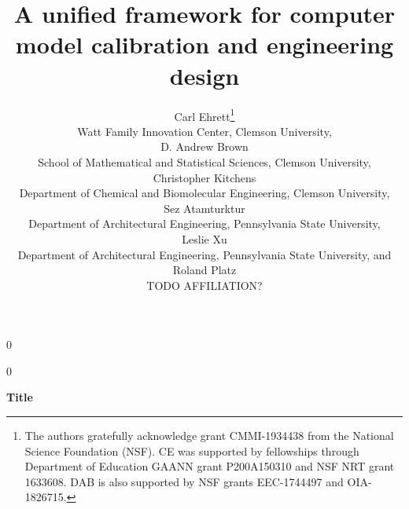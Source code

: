 \documentclass[12pt]{article}
\date{}
\newcommand{\blind}{0}
\begin{document}
%

\def\spacingset#1{\renewcommand{\baselinestretch}%
{#1}\small\normalsize} \spacingset{1}



\blind
{
  \title{\bf A unified framework for computer model calibration and engineering design}
  \author{Carl Ehrett\thanks{
  		The authors gratefully acknowledge grant CMMI-1934438 from the National Science Foundation (NSF). CE was supported by fellowships through Department of Education GAANN grant P200A150310 and NSF NRT grant 1633608. DAB is also supported by NSF grants EEC-1744497 and OIA-1826715.}\hspace{.2cm}\\
    Watt Family Innovation Center, Clemson University,\\
    D. Andrew Brown \\
    School of Mathematical and Statistical Sciences, Clemson University,\\
    Christopher Kitchens \\
    Department of Chemical and Biomolecular Engineering, Clemson University,\\
    Sez Atamturktur \\
    Department of Architectural Engineering, Pennsylvania State University,\\
	Leslie Xu \\
	Department of Architectural Engineering, Pennsylvania State University,
	and \\
	Roland Platz \\
	TODO AFFILIATION?}
  \maketitle
} \fi

\blind
{
  \bigskip
  \bigskip
  \bigskip
  \begin{center}
    {\LARGE\bf Title}
\end{center}
  \medskip
} \fi
\end{document}
